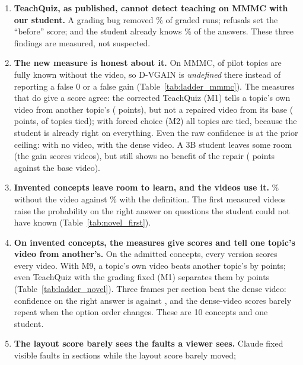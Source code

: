 \documentclass[11pt]{article}
\begin{document}
\begin{enumerate}
  \item \textbf{TeachQuiz, as published, cannot detect teaching on MMMC with our student.} A grading bug removed
  \OrderShare\% of graded runs; refusals set the ``before'' score; and the student already knows
  \mmmcpriorGemmaAcc\% of the answers. These three findings are measured, not suspected.
  \item \textbf{The new measure is honest about it.} On MMMC, \LadMMMCBlindAllRight{} of \LadMMMCTopics{} pilot topics
  are fully known without the video, so D-VGAIN is \emph{undefined} there instead of reporting a false 0 or a false
  gain (Table~\ref{tab:ladder_mmmc}). The measures that do give a score agree: the corrected TeachQuiz (M1) tells a
  topic's own video from another topic's (\LadMMMCSepOne{} points), but not a repaired video from its base
  (\LadMMMCLBOne{} points, \LadMMMCTiesOne{} of \LadMMMCTopics{} topics tied); with forced choice (M2) all
  \LadMMMCTiesTwo{} topics are tied, because the student is already right on everything. Even the raw confidence is at
  the prior ceiling: \LadMMMCSBlind{} with no video, \LadMMMCSVisual{} with the dense video. A 3B student leaves some room
  (the gain scores \LadSmallDefinedNine{} videos), but still shows no benefit of the repair (\LadSmallLBNine{} points
  against the base video).
  \item \textbf{Invented concepts leave room to learn, and the videos use it.} \novelpriorGemmaAcc\% without the video against
  \novelcardGemmaAcc\% with the definition. The first measured videos raise the probability on the right answer on
  questions the student could not have known (Table~\ref{tab:novel_first}).
  \item \textbf{On invented concepts, the measures give scores and tell one topic's video from another's.} On the \LadNovelTopics{} admitted concepts, every
  version scores every video. With M9, a topic's own video beats another topic's by \LadNovelSepNine{} points; even
  TeachQuiz with the grading fixed (M1) separates them by \LadNovelSepOne{} points (Table~\ref{tab:ladder_novel}). Three
  frames per section beat the dense video: confidence on the right answer is \LadNovelSFrames{} against
  \LadNovelSVisual{}, and the dense-video scores barely repeat when the option order changes. These are 10 concepts and
  one student.
  \item \textbf{The layout score barely sees the faults a viewer sees.}
  Claude fixed \ClaudeFaults{} visible faults in \ClaudeSections{} sections while the layout score barely moved;

\end{enumerate}
\end{document}
